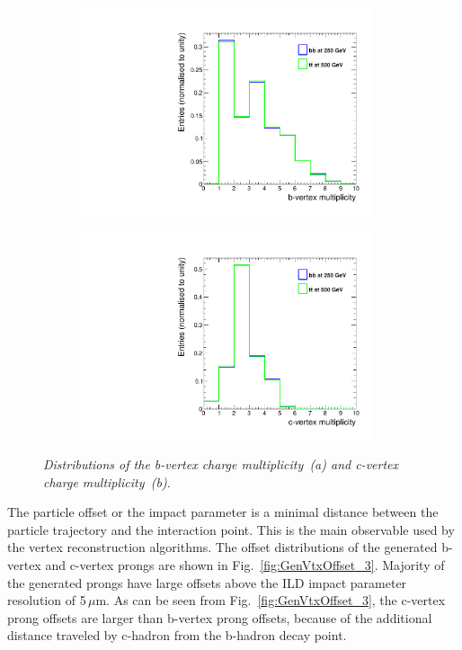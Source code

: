 \begin{figure}[H]
\centering
\begin{subfigure}{0.5\textwidth}
    \includegraphics[width=0.95\textwidth]{ILD/plots/gen-b-vtx.pdf}
\caption{\label{fig:GenVtx_a_3} }
\end{subfigure}%
  \begin{subfigure}{0.5\textwidth}
\centering
    \includegraphics[width=0.95\textwidth]{ILD/plots/gen-c-vtx.pdf}
\caption{\label{fig:GenVtx_b_3} }
\end{subfigure}
    \caption{\sl Distributions of the b-vertex charge multiplicity~(a) and c-vertex charge multiplicity~(b). }
    \label{fig:GenVtx_3}
\end{figure}

The particle offset or the impact parameter is a minimal distance between the particle trajectory and the interaction point. 
This is the main observable used by the vertex reconstruction algorithms. 
The offset distributions of the generated b-vertex and c-vertex prongs are shown in Fig.~\ref{fig:GenVtxOffset_3}.
Majority of the generated prongs have large offsets above the ILD impact parameter resolution of 5\,$\mu$m. 
As can be seen from Fig.~\ref{fig:GenVtxOffset_3}, the c-vertex prong offsets are larger than b-vertex prong offsets, because of the additional distance traveled by c-hadron from the b-hadron decay point. 

